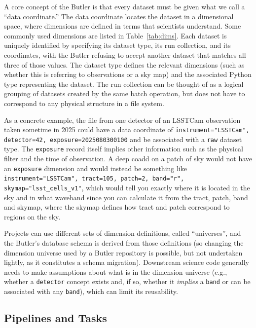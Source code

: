 A core concept of the Butler is that every dataset must be given what we call a ``data coordinate.''
The data coordinate locates the dataset in a dimensional space, where dimensions are defined in terms that scientists understand.
Some commonly used dimensions are listed in Table~\ref{tab:dims}.
Each dataset is uniquely identified by specifying its dataset type, its run collection, and its coordinates, with the Butler refusing to accept another dataset that matches all three of those values.
The dataset type defines the relevant dimensions (such as whether this is referring to observations or a sky map) and the associated Python type representing the dataset.
The run collection can be thought of as a logical grouping of datasets created by the same batch operation, but does not have to correspond to any physical structure in a file system.

As a concrete example, the file from one detector of an LSSTCam observation taken sometime in 2025 could have a data coordinate of \texttt{instrument="LSSTCam", detector=42, exposure=2025080300100} and be associated with a \texttt{raw} dataset type.
The \texttt{exposure} record itself implies other information such as the physical filter and the time of observation.
A deep coadd on a patch of sky would not have an \texttt{exposure} dimension and would instead be something like \texttt{instrument="LSSTCam", tract=105, patch=2, band="r", skymap="lsst\_cells\_v1"}, which would tell you exactly where it is located in the sky and in what waveband since you can calculate it from the tract, patch, band and skymap, where the skymap defines how tract and patch correspond to regions on the sky.

Projects can use different sets of dimension definitions, called ``universes'', and the Butler's database schema is derived from those definitions (so changing the dimension universe used by a Butler repository is possible, but not undertaken lightly, as it constitutes a schema migration).
Downstream science code generally needs to make assumptions about what is in the dimension universe (e.g., whether a \texttt{detector} concept exists and, if so, whether it \emph{implies} a \texttt{band} or can be associated with any \texttt{band}), which can limit its reusability.

\subsection{Pipelines and Tasks}

